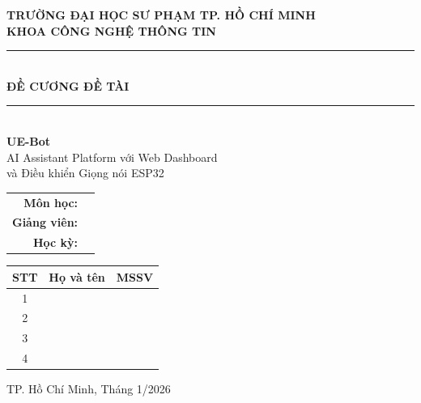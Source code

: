 \documentclass[12pt,a4paper]{article}
\begin{document}
\begin{titlepage}
    \centering
    \vspace*{1cm}
    
    
    \textbf{\Large TRƯỜNG ĐẠI HỌC SƯ PHẠM TP. HỒ CHÍ MINH}\\[0.3cm]
    \textbf{\large KHOA CÔNG NGHỆ THÔNG TIN}\\[0.5cm]
    
    \rule{\linewidth}{0.5mm}\\[0.8cm]
    
    {\Huge\bfseries ĐỀ CƯƠNG ĐỀ TÀI}\\[0.5cm]
    
    \rule{\linewidth}{0.5mm}\\[1.5cm]
    
    {\LARGE\bfseries\color{primaryblue} UE-Bot}\\[0.3cm]
    {\Large AI Assistant Platform với Web Dashboard}\\[0.2cm]
    {\Large và Điều khiển Giọng nói ESP32}\\[2cm]
    
    \begin{tabular}{rl}
        \textbf{Môn học:} & \underline{\hspace{6cm}} \\[0.5cm]
        \textbf{Giảng viên:} & \underline{\hspace{6cm}} \\[0.5cm]
        \textbf{Học kỳ:} & \underline{\hspace{6cm}} \\[0.5cm]
    \end{tabular}
    
    \vfill
    
    \begin{tabular}{|c|l|l|}
        \hline
        \textbf{STT} & \textbf{Họ và tên} & \textbf{MSSV} \\
        \hline
        1 & \hspace{4cm} & \hspace{3cm} \\
        \hline
        2 & & \\
        \hline
        3 & & \\
        \hline
        4 & & \\
        \hline
    \end{tabular}
    
    \vspace{1.5cm}
    
    {\large TP. Hồ Chí Minh, Tháng 1/2026}
    
\end{titlepage}
\end{document}
